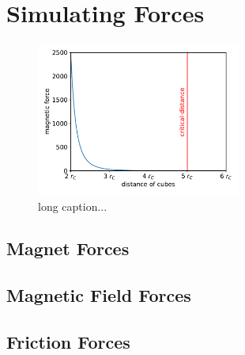 \section{Simulating Forces}



\begin{figure}
	\centering
	\includegraphics[width=0.6\textwidth]{figures/plots/magnet_force.pdf}
	\caption[Force between magnets of two cubes for distance.]{long caption...}
	\label{fig:magnet_force}
\end{figure}

\subsection{Magnet Forces}
\label{sec:force_magnet}


\subsection{Magnetic Field Forces}
\label{sec:force_field}



\subsection{Friction Forces}
\label{sec:force_friction}



